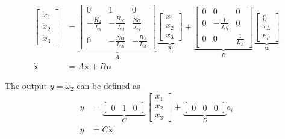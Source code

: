 \documentclass[]{article}
\begin{document}
\begin{align}
\begin{bmatrix}
	\dot{x}_1 \\
	\dot{x}_2 \\
	\dot{x}_3
\end{bmatrix}
&=
\underbrace{
	\begin{bmatrix}
		0                   & 1                      & 0                       \\
		-\frac{K_2}{J_{eq}} & -\frac{B_{eq}}{J_{eq}} & \frac{N \alpha}{J_{eq}} \\
		0                   & -\frac{N \alpha}{L_A}  & -\frac{R_A}{L_A}
	\end{bmatrix}
}_A
\underbrace{
	\begin{bmatrix}
		x_1 \\
		x_2 \\
		x_3
	\end{bmatrix}
}_\mathbf{x}
+
\underbrace{
	\begin{bmatrix}
		0 & 0               & 0             \\
		0 & -\frac{1}{J_eq} & 0             \\
		0 & 0               & \frac{1}{L_A}
	\end{bmatrix}
}_B
\underbrace{
	\begin{bmatrix}
		0      \\
		\tau_L \\
		e_i
	\end{bmatrix}
}_\mathbf{u}
\\
\mathbf{\dot{x}} &= A \mathbf{x} + B \mathbf{u} \label{eq:sys1}
\end{align}

The output $y=\dot{\omega}_2$ can be defined as
\begin{align}
y &=
\underbrace{
	\begin{bmatrix}
		0 & 1 & 0
	\end{bmatrix}
}_C
\begin{bmatrix}
	x_1 \\
	x_2 \\
	x_3
\end{bmatrix}
+
\underbrace{
	\begin{bmatrix}
		0 & 0 & 0
	\end{bmatrix}
}_D
e_i
\\
y &= C \mathbf{\dot{x}}
\end{align}
\end{document}
